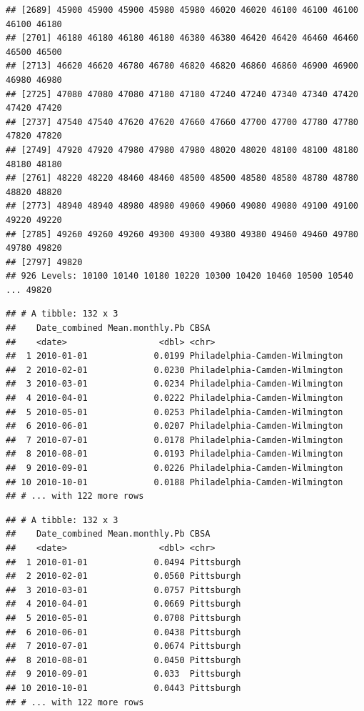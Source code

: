 \documentclass[
  12pt,
]{article}
\begin{document}
\begin{verbatim}
## [2689] 45900 45900 45900 45980 45980 46020 46020 46100 46100 46100 46100 46180
## [2701] 46180 46180 46180 46180 46380 46380 46420 46420 46460 46460 46500 46500
## [2713] 46620 46620 46780 46780 46820 46820 46860 46860 46900 46900 46980 46980
## [2725] 47080 47080 47080 47180 47180 47240 47240 47340 47340 47420 47420 47420
## [2737] 47540 47540 47620 47620 47660 47660 47700 47700 47780 47780 47820 47820
## [2749] 47920 47920 47980 47980 47980 48020 48020 48100 48100 48180 48180 48180
## [2761] 48220 48220 48460 48460 48500 48500 48580 48580 48780 48780 48820 48820
## [2773] 48940 48940 48980 48980 49060 49060 49080 49080 49100 49100 49220 49220
## [2785] 49260 49260 49260 49300 49300 49380 49380 49460 49460 49780 49780 49820
## [2797] 49820
## 926 Levels: 10100 10140 10180 10220 10300 10420 10460 10500 10540 ... 49820
\end{verbatim}

\begin{verbatim}
## # A tibble: 132 x 3
##    Date_combined Mean.monthly.Pb CBSA                          
##    <date>                  <dbl> <chr>                         
##  1 2010-01-01             0.0199 Philadelphia-Camden-Wilmington
##  2 2010-02-01             0.0230 Philadelphia-Camden-Wilmington
##  3 2010-03-01             0.0234 Philadelphia-Camden-Wilmington
##  4 2010-04-01             0.0222 Philadelphia-Camden-Wilmington
##  5 2010-05-01             0.0253 Philadelphia-Camden-Wilmington
##  6 2010-06-01             0.0207 Philadelphia-Camden-Wilmington
##  7 2010-07-01             0.0178 Philadelphia-Camden-Wilmington
##  8 2010-08-01             0.0193 Philadelphia-Camden-Wilmington
##  9 2010-09-01             0.0226 Philadelphia-Camden-Wilmington
## 10 2010-10-01             0.0188 Philadelphia-Camden-Wilmington
## # ... with 122 more rows
\end{verbatim}

\begin{verbatim}
## # A tibble: 132 x 3
##    Date_combined Mean.monthly.Pb CBSA      
##    <date>                  <dbl> <chr>     
##  1 2010-01-01             0.0494 Pittsburgh
##  2 2010-02-01             0.0560 Pittsburgh
##  3 2010-03-01             0.0757 Pittsburgh
##  4 2010-04-01             0.0669 Pittsburgh
##  5 2010-05-01             0.0708 Pittsburgh
##  6 2010-06-01             0.0438 Pittsburgh
##  7 2010-07-01             0.0674 Pittsburgh
##  8 2010-08-01             0.0450 Pittsburgh
##  9 2010-09-01             0.033  Pittsburgh
## 10 2010-10-01             0.0443 Pittsburgh
## # ... with 122 more rows
\end{verbatim}
\end{document}
